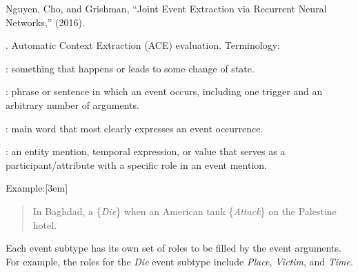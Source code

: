 \documentclass[11pt]{article}
\begin{document}
\label{Structured Prediction}





\vspace{-1em}
{\footnotesize Nguyen, Cho, and Grishman, ``Joint Event Extraction via Recurrent Neural Networks,'' (2016).}

\p {}. Automatic Context Extraction (ACE) evaluation. Terminology:
\begin{compactitem}
	\item {}: something that happens or leads to some change of state.
	\item {}: phrase or sentence in which an event occurs, including one trigger and an arbitrary number of arguments.
	\item {}: main word that most clearly expresses an event occurrence. 
	\item {}: an entity mention, temporal expression, or value that serves as a participant/attribute with a specific role in an event mention.
\end{compactitem}

Example:[3em]
\begin{quote}
	In Baghdad, a  \{\textit{Die}\} when an American tank \{\textit{Attack}\} on the Palestine hotel.
\end{quote}
Each event subtype has its own set of roles to be filled by the event arguments. For example, the roles for the \textit{Die} event subtype include \textit{Place}, \textit{Victim}, and \textit{Time}. 
\end{document}
